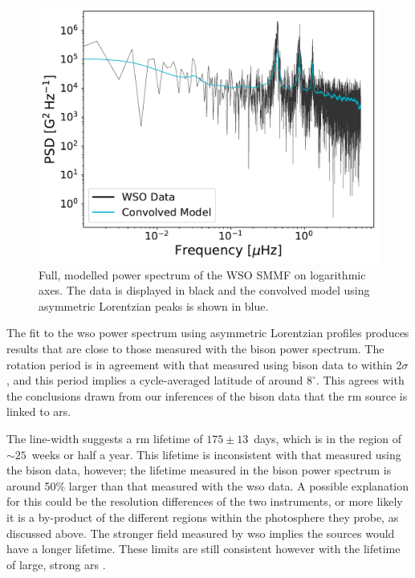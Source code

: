 \begin{figure}[ht!]
	\centering
	\includegraphics[width=\columnwidth]{WSO_PSD_model.pdf}
	\caption{Full, modelled power spectrum of the WSO SMMF on logarithmic axes. The data is displayed in black and the convolved model using asymmetric Lorentzian peaks is shown in blue.}
	\label{fig:WSO_PSD_fit}
\end{figure}



The fit to the \gls{wso} power spectrum using asymmetric Lorentzian profiles produces results that are close to those measured with the \gls{bison} power spectrum. The rotation period is in agreement with that measured using \gls{bison} data to within 2$\sigma$, and this period implies a cycle-averaged latitude of around $8^{\circ}$. This agrees with the conclusions drawn from our inferences of the \gls{bison} data that the \gls{rm} source is linked to \glspl{ar}.

The line-width suggests a \gls{rm} lifetime of $175 \pm 13$~days, which is in the region of $\sim 25$~weeks or half a year. This lifetime is inconsistent with that measured using the \gls{bison} data, however; the lifetime measured in the \gls{bison} power spectrum is around 50\% larger than that measured with the \gls{wso} data. A possible explanation for this could be the resolution differences of the two instruments, or more likely it is a by-product of the different regions within the photosphere they probe, as discussed above. The stronger field measured by \gls{wso} implies the sources would have a longer lifetime. These limits are still consistent however with the lifetime of large, strong \glspl{ar} \citep{schrijver_photospheric_1994, van_driel-gesztelyi_evolution_2015}.




